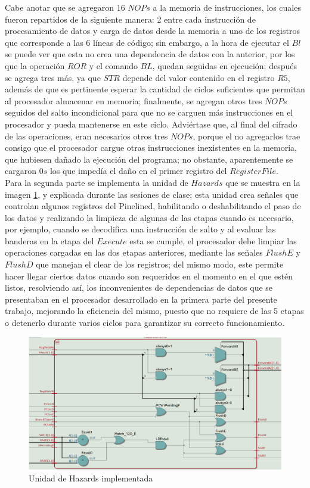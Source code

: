 Cabe anotar que se agregaron 16 $NOPs$ a la memoria de instrucciones, los cuales fueron repartidos de la siguiente manera: 2 entre cada instrucción de procesamiento de datos y carga de datos desde la memoria a uno de los registros que corresponde a las 6 líneas de código; sin embargo, a la hora de ejecutar el $Bl$ se puede ver que esta no crea una dependencia de datos con la anterior, por los que la operación $ROR$ y el comando $BL$, quedan seguidas en ejecución; después se agrega tres más, ya que $STR$ depende del valor contenido en el registro $R5$, además de que es pertinente esperar la cantidad de ciclos suficientes que permitan al procesador almacenar en memoria; finalmente, se agregan otros tres $NOPs$ seguidos del salto incondicional para que no se carguen más instrucciones en el procesador y pueda mantenerse en este ciclo. Adviértase que, al final del cifrado de las operaciones, eran necesarios otros tres $NOPs$, porque el no agregarlos trae consigo que el procesador cargue otras instrucciones inexistentes en la memoria, que hubiesen dañado la ejecución del programa; no obstante, aparentemente se cargaron $0s$ los que impedía el daño en el primer registro del $Register File$.\\

Para la segunda parte se implementa la unidad de $Hazards$ que se muestra en la imagen \ref{fig:HazardUnit}, y explicada durante las sesiones de clase; esta unidad crea señales que controlan algunos registros del Pinelined, habilitando o deshabilitando el paso de los datos y realizando la limpieza de algunas de las etapas cuando es necesario, por ejemplo, cuando se decodifica una instrucción de salto y al evaluar las banderas en la etapa del $Execute$ esta se cumple, el procesador debe limpiar las operaciones cargadas en las dos etapas anteriores, mediante las señales $FlushE$ y $FlushD$ que manejan el clear de los registros; del mismo modo, este permite hacer llegar ciertos datos cuando son requeridos en el momento en el que estén listos, resolviendo así, los inconvenientes de dependencias de datos que se presentaban en el procesador desarrollado en la primera parte del presente trabajo, mejorando la eficiencia del mismo, puesto que no requiere de las 5 etapas o detenerlo durante varios ciclos para garantizar su correcto funcionamiento.\\ 

\begin{figure}[H]
	\centering
	\includegraphics[width = \linewidth]{images/Esquematico_Hazards.png}
	\caption{Unidad de Hazards implementada}
	\label{fig:HazardUnit}
\end{figure}

